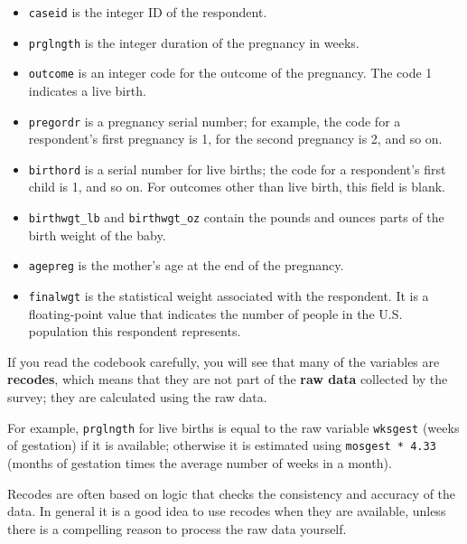 \documentclass[12pt]{book}
\theoremstyle{exercise}
\begin{document}
\begin{itemize}

\item {\tt caseid} is the integer ID of the respondent.

\item {\tt prglngth} is the integer duration of the pregnancy in weeks.%

\item {\tt outcome} is an integer code for the outcome of the
  pregnancy.  The code 1 indicates a live birth.

\item {\tt pregordr} is a pregnancy serial number; for example, the
  code for a respondent's first pregnancy is 1, for the second
  pregnancy is 2, and so on.

\item {\tt birthord} is a serial number for live
  births; the code for a respondent's first child is 1, and so on.
  For outcomes other than live birth, this field is blank.

\item \verb"birthwgt_lb" and \verb"birthwgt_oz" contain the pounds and
  ounces parts of the birth weight of the baby.%
%

\item {\tt agepreg} is the mother's age at the end of the pregnancy.

\item {\tt finalwgt} is the statistical weight associated with the
  respondent.  It is a floating-point value that indicates the number
  of people in the U.S. population this respondent represents.%

\end{itemize}

If you read the codebook carefully, you will see that many of the
variables are {\bf recodes}, which means that they are not part of the
{\bf raw data} collected by the survey; they are calculated using
the raw data.%
%

For example, {\tt prglngth} for live births is equal to the raw
variable {\tt wksgest} (weeks of gestation) if it is available;
otherwise it is estimated using {\tt mosgest * 4.33} (months of
gestation times the average number of weeks in a month).

Recodes are often based on logic that checks the consistency and
accuracy of the data.  In general it is a good idea to use recodes
when they are available, unless there is a compelling reason to
process the raw data yourself.
\end{document}
